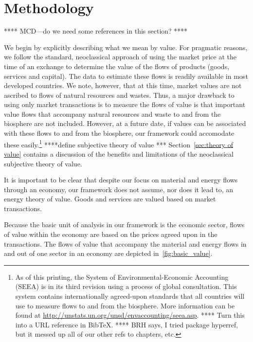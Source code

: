 \section{Methodology}
\label{sec:Value_Methodology}

**** MCD---do we need some references in this section? ****

We begin by explicitly describing what we mean by value. 
For pragmatic reasons, we follow the standard, neoclassical approach of using the market price at the time of an exchange
 to determine the value of the flows of products (goods, services and capital). The data to estimate these flows is readily available in most developed countries. We note, however, that at this time, 
market values are not ascribed to flows of natural resources and wastes. Thus, a major drawback to using only market transactions is to measure the flows of value is that
important value flows that accompany natural resources and waste to and from
the biosphere are not included. However, at a future date, if values can be
associated with these flows to and from the biosphere, our framework could accomodate these easily.\footnote{As of this printing, 
the System of Environmental-Economic Accounting (SEEA) is in its third revision 
using a process of global consultation. 
This system contains internationally agreed-upon standards that all countries will use to measure
flows to and from the biosphere. 
More information can be found at \url{http://unstats.un.org/unsd/envaccounting/seea.asp}.
**** Turn this into a URL reference in BibTeX. **** BRH says, I tried package hyperref, but 
it messed up all of our other refs to chapters, etc.} ****define subjective theory of value ***
Section~\ref{sec:theory of value} 
contains a discussion of the benefits and limitations of the neoclassical subjective theory of value.



It is important to be clear that despite our focus on material and energy flows through an economy, 
our framework does not assume, nor does it lead to, an energy theory of value. 
Goods and services are valued based on market transactions. 



Because the basic unit of analysis in our framework is the economic sector, 
flows of value within the economy are based on the prices agreed 
upon in the transactions. 
The flows of value that accompany the material and energy flows in and out 
of one sector in an economy are depicted in~\ref{fig:basic_value}. 

